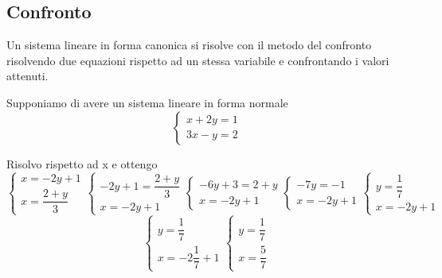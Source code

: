 \subsection{Confronto}
\label{sec:Confronto}
Un sistema lineare in forma canonica si risolve con il metodo del confronto risolvendo due equazioni rispetto ad un stessa variabile e confrontando i valori attenuti.
\begin{esempiot}{}{}
Supponiamo di avere un sistema lineare in forma normale
\[
\begin{cases}
	x+2y=1\\
	3x-y=2
\end{cases}
\]
\end{esempiot}
Risolvo rispetto ad x e ottengo
\[
\begin{cases}
	x=-2y+1\\
	x=\dfrac{2+y}{3}
\end{cases}
\begin{cases}
	-2y+1=\dfrac{2+y}{3}\\
		x=-2y+1
\end{cases}
\begin{cases}
	-6y+3=2+y\\
	x=-2y+1
\end{cases}
\begin{cases}
	-7y=-1\\
	x=-2y+1
\end{cases}
\begin{cases}
	y=\dfrac{1}{7}\\
	x=-2y+1
\end{cases}
\]
\[
\begin{cases}
	y=\dfrac{1}{7}\\
	x=-2\dfrac{1}{7}+1
\end{cases}
\begin{cases}
	y=\dfrac{1}{7}\\
	x=\dfrac{5}{7}
\end{cases}
\]

